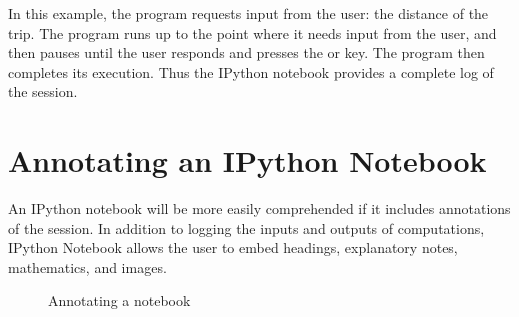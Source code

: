 \documentclass[letterpaper,10pt,english]{sphinxmanual}
\begin{document}
In this example, the program requests input from the user: the distance of the trip.  The program runs up to the point where it needs input from the user, and then pauses until the user responds and presses the  or  key.  The program then completes its execution.  Thus the IPython notebook provides a complete log of the session.


\section{Annotating an IPython Notebook}
\label{apdx2/apdx2_ipynb:annotating-an-ipython-notebook}
An IPython notebook will be more easily comprehended if it includes annotations of the session.  In addition to logging the inputs and outputs of computations, IPython Notebook allows the user to embed headings, explanatory notes, mathematics, and images.
\begin{figure}[htbp]
\centering
\capstart

\caption{Annotating a notebook}\label{apdx2/apdx2_ipynb:fig-ipynotefinaltop}\end{figure}
\end{document}
